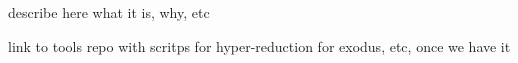 
\begin{DoxyItemize}
\item describe here what it is, why, etc
\item link to tools repo with scritps for hyper-\/reduction for exodus, etc, once we have it 
\end{DoxyItemize}